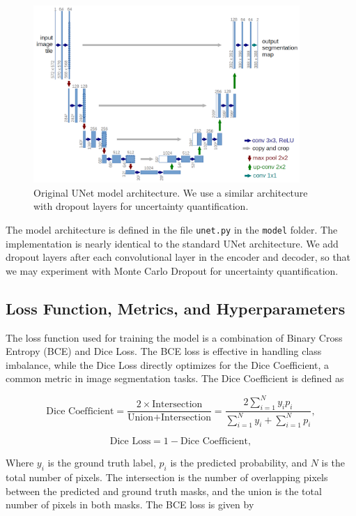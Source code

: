 \documentclass{article}
\begin{document}
\begin{figure}[h]
    \centering
    \includegraphics[width=0.9\textwidth]{../images/unet.png}
    \caption{Original UNet model architecture. We use a similar architecture with dropout layers for uncertainty quantification.} 
    \label{fig:unet_architecture}
\end{figure}
\vspace{1em}

The model architecture is defined in the file \texttt{unet.py} in the \texttt{model} folder. The implementation
is nearly identical to the standard UNet architecture. We add dropout layers after each convolutional layer
in the encoder and decoder, so that we may experiment with Monte Carlo Dropout for uncertainty quantification.

\subsection{Loss Function, Metrics, and Hyperparameters}

The loss function used for training the model is a combination of Binary Cross Entropy (BCE) and Dice Loss.
The BCE loss is effective in handling class imbalance, while the Dice Loss directly optimizes for the Dice
Coefficient, a common metric in image segmentation tasks. The Dice Coefficient is defined as

\[
\text{Dice Coefficient} = \frac{2 \times \text{Intersection}}{\text{Union} + \text{Intersection}} = 
\frac{2 \sum_{i=1}^{N} y_i p_i}{\sum_{i=1}^{N} y_i + \sum_{i=1}^{N} p_i},
\]

\[
\text{Dice Loss} = 1 - \text{Dice Coefficient},
\]

Where \( y_i \) is the ground truth label, \( p_i \) is the predicted probability, and \( N \) is the total 
number of pixels. The intersection is the number of overlapping pixels between the predicted and ground truth 
masks, and the union is the total number of pixels in both masks. The BCE loss is given by
\end{document}

